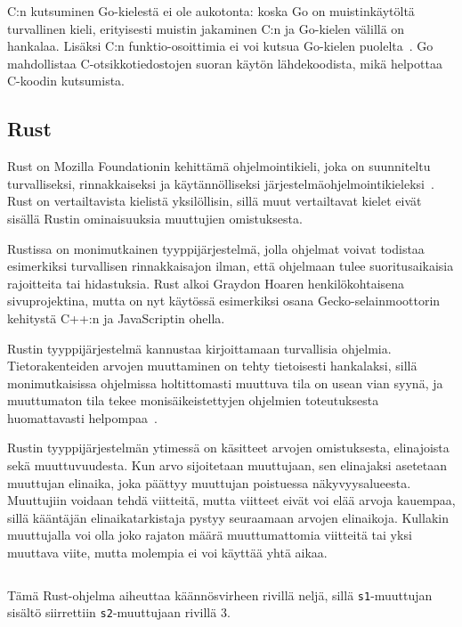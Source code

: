 C:n kutsuminen Go-kielestä ei ole aukotonta: koska Go on muistinkäytöltä
turvallinen kieli, erityisesti muistin jakaminen C:n ja Go-kielen välillä on
hankalaa. Lisäksi C:n funktio-osoittimia ei voi kutsua Go-kielen
puolelta~\citep{cgo}. Go mahdollistaa C-otsikkotiedostojen suoran käytön
lähdekoodista, mikä helpottaa C-koodin kutsumista.

\subsection{Rust}
\label{sec:rust}

Rust on Mozilla Foundationin kehittämä ohjelmointikieli, joka on suunniteltu
turvalliseksi, rinnakkaiseksi ja käytännölliseksi
järjestelmäohjelmointikieleksi~\citep{rustfaq}. Rust on vertailtavista kielistä
yksilöllisin, sillä muut vertailtavat kielet eivät sisällä Rustin ominaisuuksia
muuttujien omistuksesta.

Rustissa on monimutkainen tyyppijärjestelmä, jolla ohjelmat voivat todistaa
esimerkiksi turvallisen rinnakkaisajon ilman, että ohjelmaan tulee
suoritusaikaisia rajoitteita tai hidastuksia. Rust alkoi Graydon Hoaren
henkilökohtaisena sivuprojektina, mutta on nyt käytössä esimerkiksi osana
Gecko-se\-lain\-moot\-to\-rin kehitystä C++:n ja JavaScriptin ohella.

Rustin tyyppijärjestelmä kannustaa kirjoittamaan turvallisia ohjelmia.
Tietorakenteiden arvojen muuttaminen on tehty tietoisesti hankalaksi, sillä
monimutkaisissa ohjelmissa holtittomasti muuttuva tila on usean vian syynä, ja
muuttumaton tila tekee monisäikeistettyjen ohjelmien
toteutuksesta huomattavasti helpompaa~\citep[luku 4, kohta 17]{effectivejava}.

Rustin tyyppijärjestelmän ytimessä on käsitteet arvojen
omistuksesta, elinajoista sekä
muuttuvuudesta. Kun arvo sijoitetaan muuttujaan, sen
elinajaksi asetetaan muuttujan elinaika, joka päättyy muuttujan poistuessa
näkyvyysalueesta. Muuttujiin voidaan tehdä viitteitä, mutta
viitteet eivät voi elää arvoja kauempaa, sillä kääntäjän
elinaikatarkistaja pystyy seuraamaan arvojen
elinaikoja. Kullakin muuttujalla voi olla joko rajaton määrä muuttumattomia
viitteitä tai yksi muuttava viite, mutta molempia ei voi käyttää yhtä aikaa.

\begin{listing}[ht!]
    \inputminted{Rust}{koodi/hello.rs}
    \caption{Tämä Rust-ohjelma aiheuttaa käännösvirheen rivillä neljä, sillä
    \texttt{s1}-muuttujan sisältö siirrettiin \texttt{s2}-muuttujaan rivillä
    3.}
    \label{fig:hellors}
\end{listing}

